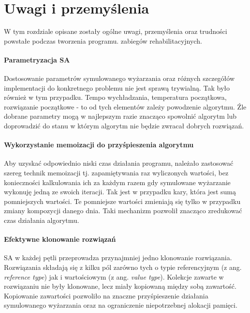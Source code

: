 \chapter{Uwagi i przemyślenia}
W tym rozdziale opisane zostały ogólne uwagi, przemyślenia oraz trudności
powstałe podczas tworzenia programu.
zabiegów rehabilitacyjnych.

\subsubsection{Parametryzacja SA}
Dostosowanie parametrów symulowanego wyżarzania oraz różnych szczegółów
implementacji do konkretnego problemu nie jest sprawą trywialną. Tak było
również w tym przypadku. Tempo wychładzania, temperatura początkowa, rozwiązanie
początkowe - to od tych elementów zależy powodzenie algorytmu. Źle dobrane
parametry mogą w najlepszym razie znacząco spowolnić algorytm lub doprowadzić do
stanu w którym algorytm nie będzie zwracał dobrych rozwiązań.

\subsubsection{Wykorzystanie memoizacji do przyśpieszenia algorytmu}
Aby uzyskać odpowiednio niski czas działania programu,
należało zastosować szereg technik memoizacji tj. zapamiętywania raz wyliczonych
wartości, bez konieczności kalkulowania ich za każdym razem gdy symulowane
wyżarzanie wykonuję jedną ze swoich iteracji. Tak jest w przypadku kary, która
jest sumą pomniejszych wartości. Te pomniejsze wartości zmieniają się tylko w
przypadku zmiany kompozycji danego dnia. Taki mechanizm pozwolił znacząco
zredukować czas działania algorytmu.

\subsubsection{Efektywne klonowanie rozwiązań}
SA w każdej pętli przeprowadza przynajmniej jedno klonowanie rozwiązania.
Rozwiązania składają się z kilku pól zarówno tych o typie referencyjnym (z ang.
\emph{reference type}) jak i wartościowym (z ang. \emph{value type}). Kolekcje
zawarte w rozwiązaniu nie były klonowane, lecz miały kopiowaną między sobą
zawartość. Kopiowanie zawartości pozwoliło na znaczne przyśpieszenie działania
symulowanego wyżarzania oraz na ograniczenie niepotrzebnej alokacji pamięci.
